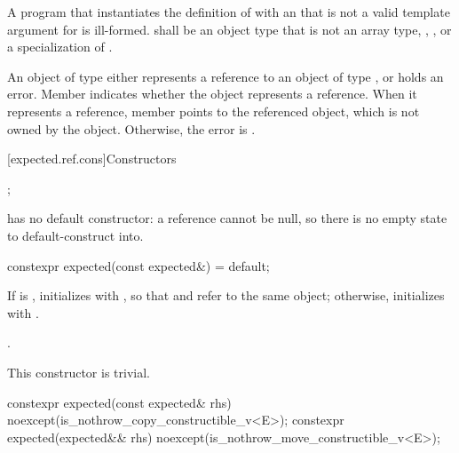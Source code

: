 \begin{itemdescr}
\pnum
\mandates
A program that instantiates the definition of  with an  that is not a valid template argument for  is ill-formed.  shall be an object type that is not an array type, , , or a specialization of .

\pnum
\remarks
An object of type  either represents a reference to an object of type , or holds an error. Member  indicates whether the object represents a reference. When it represents a reference, member  points to the referenced object, which is not owned by the  object. Otherwise, the error is .
\end{itemdescr}

[expected.ref.cons]{Constructors}

%
\begin{itemdecl}
;
\end{itemdecl}

\begin{itemdescr}
\pnum
\remarks
{} has no default constructor: a reference cannot be null, so there is no empty state to default-construct into.
\end{itemdescr}

%
\begin{itemdecl}
constexpr expected(const expected&) = default;
\end{itemdecl}

\begin{itemdescr}
\pnum
\effects
If  is , initializes  with , so that  and  refer to the same object; otherwise, initializes  with .

\pnum
\ensures
{}.

\pnum
\remarks
This constructor is trivial.
\end{itemdescr}

%
\begin{itemdecl}
constexpr expected(const expected& rhs) noexcept(is_nothrow_copy_constructible_v<E>);
constexpr expected(expected&& rhs) noexcept(is_nothrow_move_constructible_v<E>);
\end{itemdecl}

